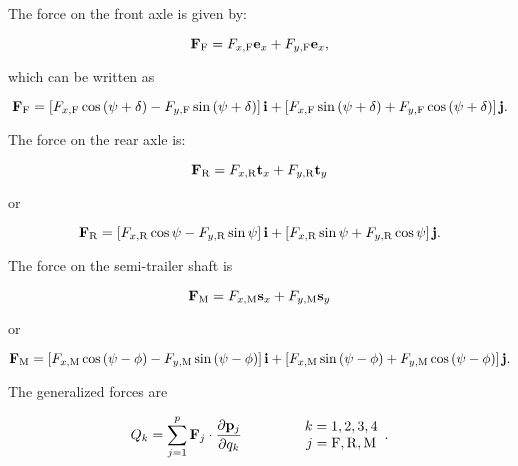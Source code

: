 \documentclass[sublist]{fei}
\begin{document}
The force on the front axle is given by:

\begin{equation}
    {\bf F}_{\rm F} = F_{x,{\rm F}} {\bf e}_x + F_{y,{\rm F}} {\bf e}_x,
\end{equation}

which can be written as

\begin{equation} \label{ForceFront}
    {\bf F}_{\rm F} = \left[ F_{x,{\rm F}} \cos \left( \psi + \delta \right) - F_{y,{\rm F}} \sin \left( \psi + \delta \right) \right] {\bf i} + \left[ F_{x,{\rm F}} \sin \left( \psi + \delta \right) + F_{y,{\rm F}} \cos \left( \psi + \delta \right) \right] {\bf j}.
\end{equation}

The force on the rear axle is:

\begin{equation}
    {\bf F}_{\rm R} = F_{x,{\rm R}} {\bf t}_x + F_{y,{\rm R}} {\bf t}_y
\end{equation}

or

\begin{equation} \label{ForceRear}
    {\bf F}_{\rm R} = \left[ F_{x,{\rm R}} \cos \psi - F_{y,{\rm R}} \sin \psi \right] {\bf i} + \left[ F_{x,{\rm R}} \sin \psi + F_{y,{\rm R}} \cos \psi \right] {\bf j}.
\end{equation}

The force on the semi-trailer shaft is

\begin{equation}
    {\bf F}_{\rm M} = F_{x,{\rm M}} {\bf s}_x + F_{y,{\rm M}} {\bf s}_y
\end{equation}

or

\begin{equation} \label{ForceSemi}
    {\bf F}_{\rm M} = \left[ F_{x,{\rm M}} \cos \left( \psi - \phi \right) - F_{y,{\rm M}} \sin \left( \psi - \phi \right) \right] {\bf i} + \left[ F_{x,{\rm M}} \sin \left( \psi - \phi \right) + F_{y,{\rm M}} \cos \left( \psi - \phi \right) \right] {\bf j}.
\end{equation}

The generalized forces are

\begin{equation}
    Q_k = \sum_{j = 1} ^p {\bf F}_j \cdot \frac{\partial {\bf p}_j}{\partial q_k} \qquad \qquad \begin{array}{c} k = 1, 2, 3, 4 \\ j = {\rm F}, {\rm R}, {\rm M} \end{array}.
\end{equation}
\end{document}
